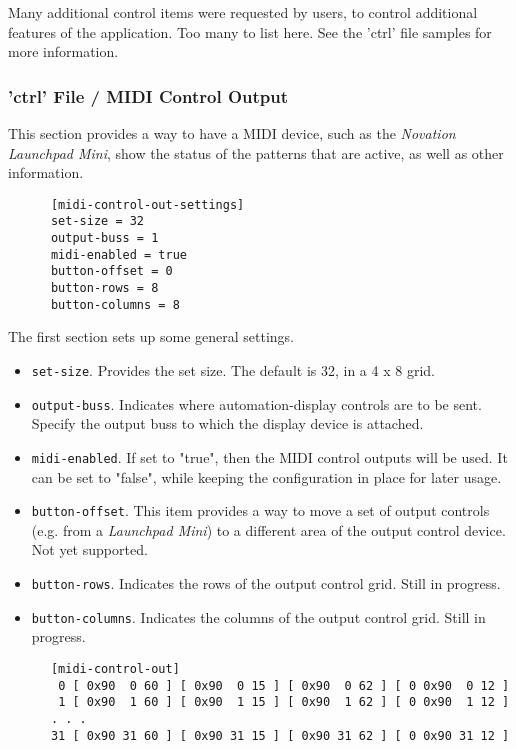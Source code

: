    Many additional control items were requested by users, to control
   additional features of the application.  Too many to list here.
   See the 'ctrl' file samples for more information.

\subsubsection{'ctrl' File / MIDI Control Output}
\label{subsubsec:configuration_ctrl_midi_control_out}

   This section provides a way to have a MIDI device, such as the
   \textsl{Novation Launchpad Mini}, show the status
   of the patterns that are active, as well as other information.

   \begin{verbatim}
      [midi-control-out-settings]
      set-size = 32
      output-buss = 1
      midi-enabled = true
      button-offset = 0
      button-rows = 8
      button-columns = 8
   \end{verbatim}

   The first section sets up some general settings.

   \begin{itemize}
      \item \texttt{set-size}.
         Provides the set size.  The default is 32, in a 4 x 8 grid.
      \item \texttt{output-buss}.
         Indicates where automation-display controls are to be sent.
         Specify the output buss to which the display device is attached.
      \item \texttt{midi-enabled}.
         If set to "true", then the MIDI control outputs will be used.
         It can be set to "false", while keeping the configuration in place
         for later usage.
      \item \texttt{button-offset}.
         This item provides a way to move a set of output controls (e.g. from a
         \textsl{Launchpad Mini}) to a different area of the output control
         device.  Not yet supported.
      \item \texttt{button-rows}.
         Indicates the rows of the output control grid.
         Still in progress.
      \item \texttt{button-columns}.
         Indicates the columns of the output control grid.
         Still in progress.
   \end{itemize}

   \begin{verbatim}
      [midi-control-out]
       0 [ 0x90  0 60 ] [ 0x90  0 15 ] [ 0x90  0 62 ] [ 0 0x90  0 12 ]
       1 [ 0x90  1 60 ] [ 0x90  1 15 ] [ 0x90  1 62 ] [ 0 0x90  1 12 ]
      . . .
      31 [ 0x90 31 60 ] [ 0x90 31 15 ] [ 0x90 31 62 ] [ 0 0x90 31 12 ]
   \end{verbatim}

